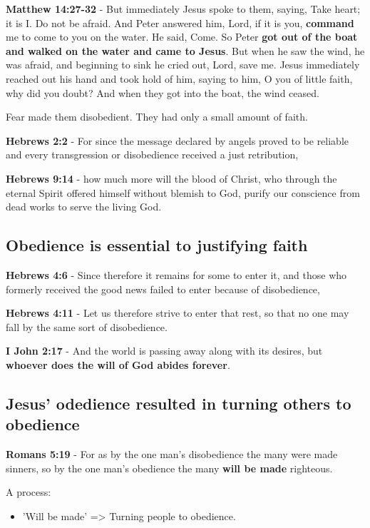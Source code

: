 \documentclass[11pt]{article}
\begin{document}
\textbf{Matthew 14:27-32} - But immediately Jesus spoke to them, saying, Take heart; it is I. Do not be afraid.  And Peter answered him, Lord, if it is you, \textbf{command} me to come to you on the water.  He said, Come. So Peter \textbf{got out of the boat and walked on the water and came to Jesus}.  But when he saw the wind, he was afraid, and beginning to sink he cried out, Lord, save me.  Jesus immediately reached out his hand and took hold of him, saying to him, O you of little faith, why did you doubt?  And when they got into the boat, the wind ceased.

Fear made them disobedient. They had only a small amount of faith.

\textbf{Hebrews 2:2} - For since the message declared by angels proved to be reliable and every transgression or disobedience received a just retribution,

\textbf{Hebrews 9:14} - how much more will the blood of Christ, who through the eternal Spirit offered himself without blemish to God, purify our conscience from dead works to serve the living God.

\subsection{Obedience is essential to justifying faith}
\label{sec:org0fc5a74}
\textbf{Hebrews 4:6} - Since therefore it remains for some to enter it, and those who formerly received the good news failed to enter because of disobedience,

\textbf{Hebrews 4:11} - Let us therefore strive to enter that rest, so that no one may fall by the same sort of disobedience.

\textbf{I John 2:17} - And the world is passing away along with its desires, but \textbf{whoever does the will of God abides forever}.

\subsection{Jesus' odedience resulted in turning others to obedience}
\label{sec:org06d72d8}
\textbf{Romans 5:19} - For as by the one man's disobedience the many were made sinners, so by the one man's obedience the many \textbf{will be made} righteous.

A process:
\begin{itemize}
\item 'Will be made' => Turning people to obedience.
\end{itemize}
\end{document}
